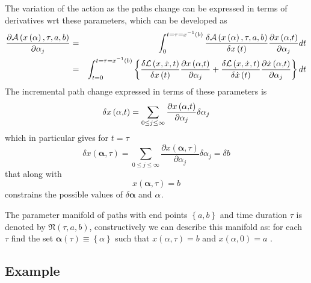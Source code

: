\documentclass[aps,preprint]{revtex4}
\begin{document}
The variation of the action as the paths change can be expressed in terms of
derivatives wrt these parameters, which can be developed as
\begin{eqnarray}
\frac{\partial \mathcal{A}\left( x\left( \mathbf{\alpha }\right) ,\tau
,a,b\right) }{\partial \alpha _{j}} &=&\int_{0}^{t=\tau =x^{-1}\left(
b\right) }\frac{\delta \mathcal{A}\left( x\left( \mathbf{\alpha }\right)
,\tau ,a,b\right) }{\delta x\left( t\right) }\frac{\partial x\left( \mathbf{%
\alpha ,}t\right) }{\partial \alpha _{j}}dt  \notag \\
&=&\int_{t=0}^{t=\tau =x^{-1}\left( b\right) }\left\{ \frac{\delta \mathcal{L%
}\left( x,\dot{x},t\right) }{\delta x\left( t\right) }\frac{\partial x\left(
\mathbf{\alpha ,}t\right) }{\partial \alpha _{j}}+\frac{\delta \mathcal{L}%
\left( x,\dot{x},t\right) }{\delta \dot{x}\left( t\right) }\frac{\partial
\dot{x}\left( \mathbf{\alpha ,}t\right) }{\partial \alpha _{j}}\right\} dt
\end{eqnarray}%
The incremental path change expressed in terms of these parameters is
\begin{equation}
\delta x\left( \mathbf{\alpha ,}t\right) =\sum_{0\leq j\leq \infty }\frac{%
\partial x\left( \mathbf{\alpha ,}t\right) }{\partial \alpha _{j}}\delta
\alpha _{j}
\end{equation}%
which in particular gives for $t=\tau $
\begin{equation}
\delta x\left( \mathbf{\alpha ,}\tau \right) =\sum_{0\leq j\leq \infty }%
\frac{\partial x\left( \mathbf{\alpha ,}\tau \right) }{\partial \alpha _{j}}%
\delta \alpha _{j}=\delta b
\end{equation}%
that along with
\begin{equation}
x\left( \mathbf{\alpha ,}\tau \right) =b
\end{equation}%
constrains the possible values of $\delta \mathbf{\alpha }$ and $\mathbf{%
\alpha }$.

The parameter manifold of paths with end points $\left\{ a,b\right\} $ and
time duration $\tau $ is denoted by $\mathfrak{N}\left( \tau ,a,b\right) $,
constructively we can describe this manifold as: for each $\tau $ find the
set $\mathbf{\alpha }\left( \tau \right) \equiv \left\{ \alpha \right\} $
such that $x\left( \alpha ,\tau \right) =b$ and $x\left( \alpha ,0\right) =a$%
.

\subsection{Example}
\end{document}
